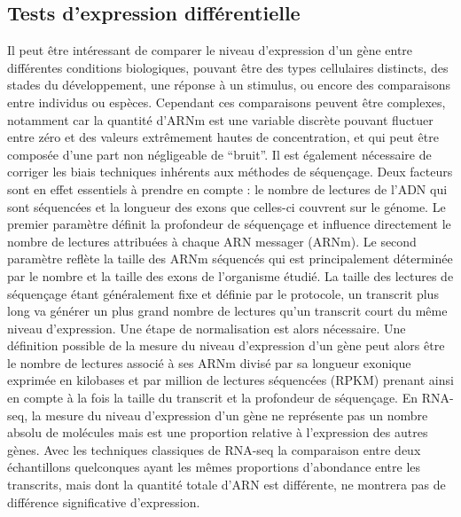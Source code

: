 \subsection{Tests d’expression différentielle}
\label{subsec:expression-différentielle}

Il peut être intéressant de comparer le niveau d’expression d’un gène entre différentes \glspl{condition} biologiques, pouvant être des types cellulaires distincts, des stades du développement, une réponse à un stimulus, ou encore des comparaisons entre individus ou espèces. Cependant ces comparaisons peuvent être complexes, notamment car la quantité d’\acrshort{ARNm} est une variable discrète pouvant fluctuer entre zéro et des valeurs extrêmement hautes de concentration, et qui peut être composée d’une part non négligeable de “bruit”. Il est également nécessaire de corriger les biais techniques inhérents aux méthodes de séquençage. Deux facteurs sont en effet essentiels à prendre en compte : le nombre de lectures de l’\acrshort{ADN} qui sont séquencées et la longueur des exons que celles-ci couvrent sur le génome. Le premier paramètre définit la profondeur de séquençage et influence directement le nombre de lectures attribuées à chaque \acrshort{ARN} messager (\acrshort{ARNm}). Le second paramètre reflète la taille des \acrshort{ARNm} séquencés qui est principalement déterminée par le nombre et la taille des exons de l’organisme étudié. La taille des lectures de séquençage étant généralement fixe et définie par le protocole, un transcrit plus long va générer un plus grand nombre de lectures qu’un transcrit court du même niveau d’expression. Une étape de normalisation est alors nécessaire. Une définition possible de la mesure du niveau d’expression d’un gène peut alors être le nombre de lectures associé à ses \acrshort{ARNm} divisé par sa longueur exonique exprimée en kilobases et par million de lectures séquencées (\acrshort{RPKM}) prenant ainsi en compte à la fois la taille du transcrit et la profondeur de séquençage. En \acrshort{RNA-seq}, la mesure du niveau d’expression d’un gène ne représente pas un nombre absolu de molécules mais est une proportion relative à l’expression des autres gènes. Avec les techniques classiques de RNA-seq la comparaison entre deux échantillons quelconques ayant les mêmes proportions d’abondance entre les transcrits, mais dont la quantité totale d’\acrshort{ARN} est différente, ne montrera pas de différence significative d’expression. \\

